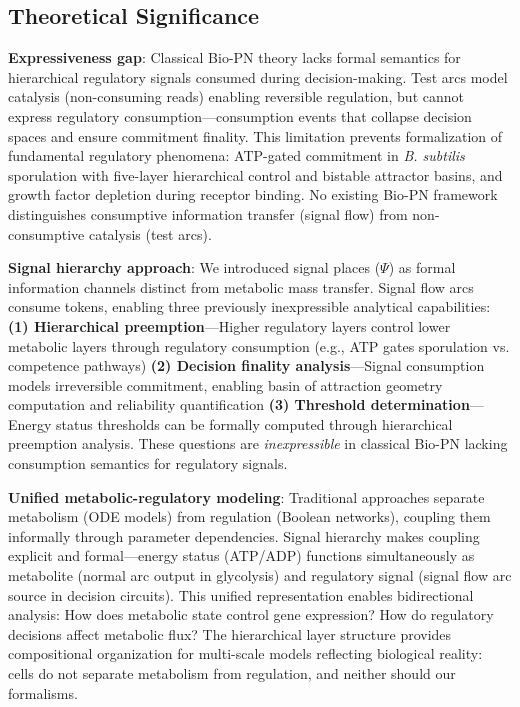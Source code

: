
\subsection{Theoretical Significance}

\vspace{3pt}
\noindent\textbf{Expressiveness gap}: Classical Bio-PN theory lacks formal semantics for hierarchical regulatory signals consumed during decision-making. Test arcs model catalysis (non-consuming reads) enabling reversible regulation, but cannot express regulatory consumption---consumption events that collapse decision spaces and ensure commitment finality. This limitation prevents formalization of fundamental regulatory phenomena: ATP-gated commitment in \textit{B. subtilis} sporulation with five-layer hierarchical control and bistable attractor basins, and growth factor depletion during receptor binding. No existing Bio-PN framework distinguishes consumptive information transfer (signal flow) from non-consumptive catalysis (test arcs).

\vspace{3pt}
\noindent\textbf{Signal hierarchy approach}: We introduced signal places ($\Psi$) as formal information channels distinct from metabolic mass transfer. Signal flow arcs consume tokens, enabling three previously inexpressible analytical capabilities: \textbf{(1) Hierarchical preemption}---Higher regulatory layers control lower metabolic layers through regulatory consumption (e.g., ATP gates sporulation vs. competence pathways) \textbf{(2) Decision finality analysis}---Signal consumption models irreversible commitment, enabling basin of attraction geometry computation and reliability quantification \textbf{(3) Threshold determination}---Energy status thresholds can be formally computed through hierarchical preemption analysis. These questions are \textit{inexpressible} in classical Bio-PN lacking consumption semantics for regulatory signals.

\vspace{3pt}
\noindent\textbf{Unified metabolic-regulatory modeling}: Traditional approaches separate metabolism (ODE models) from regulation (Boolean networks), coupling them informally through parameter dependencies. Signal hierarchy makes coupling explicit and formal---energy status (ATP/ADP) functions simultaneously as metabolite (normal arc output in glycolysis) and regulatory signal (signal flow arc source in decision circuits). This unified representation enables bidirectional analysis: How does metabolic state control gene expression? How do regulatory decisions affect metabolic flux? The hierarchical layer structure provides compositional organization for multi-scale models reflecting biological reality: cells do not separate metabolism from regulation, and neither should our formalisms.

